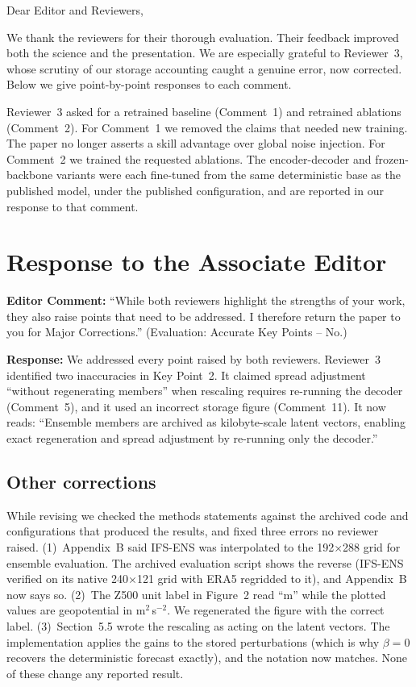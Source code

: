 \documentclass[12pt]{article}
\begin{document}
\vspace{1cm}

Dear Editor and Reviewers,

We thank the reviewers for their thorough evaluation. Their feedback improved
both the science and the presentation. We are especially grateful to
Reviewer~3, whose scrutiny of our storage accounting caught a genuine error,
now corrected. Below we give point-by-point responses to each comment.

Reviewer~3 asked for a retrained baseline (Comment~1) and retrained
ablations (Comment~2). For Comment~1 we removed the claims that needed new
training. The paper no longer asserts a skill advantage over global noise
injection. For Comment~2 we trained the requested ablations. The
encoder-decoder and frozen-backbone variants were each fine-tuned from the
same deterministic base as the published model, under the published
configuration, and are reported in our response to that comment.

\section*{Response to the Associate Editor}

\textbf{Editor Comment:} ``While both reviewers highlight the strengths of your work,
they also raise points that need to be addressed. I therefore return the paper to you
for Major Corrections.'' (Evaluation: Accurate Key Points -- No.)

\textbf{Response:} We addressed every point raised by both reviewers. Reviewer~3
identified two inaccuracies in Key Point~2. It claimed spread adjustment ``without
regenerating members'' when rescaling requires re-running the decoder (Comment~5),
and it used an incorrect storage figure (Comment~11). It now reads:
``Ensemble members are archived as kilobyte-scale latent vectors, enabling exact
regeneration and spread adjustment by re-running only the decoder.''

\subsection*{Other corrections}

While revising we checked the methods statements against the archived code and
configurations that produced the results, and fixed three errors no reviewer raised.
(1)~Appendix~B said IFS-ENS was interpolated to the 192$\times$288 grid for ensemble
evaluation. The archived evaluation script shows the reverse (IFS-ENS verified on
its native 240$\times$121 grid with ERA5 regridded to it), and Appendix~B now says
so. (2)~The Z500 unit label in
Figure~2 read ``m'' while the plotted values are geopotential in m$^2$\,s$^{-2}$.
We regenerated the figure with the correct label. (3)~Section~5.5 wrote the
rescaling as acting on the latent vectors. The implementation applies the gains to
the stored perturbations (which is why $\beta=0$ recovers the deterministic forecast
exactly), and the notation now matches. None of these change any reported result.
\end{document}
